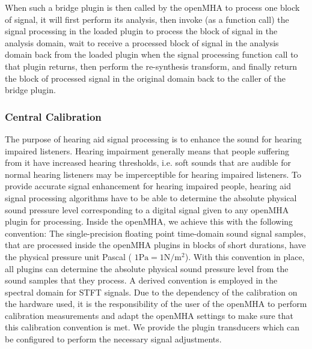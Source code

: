 When such a bridge plugin is then called by the openMHA to process one block of signal, it will first perform its analysis, then invoke (as a function call) the signal processing in the loaded plugin to process the block of signal in the analysis domain, wait to receive a processed block of signal in the analysis domain back from the loaded plugin when the signal processing function call to that plugin returns, then perform the re-\/synthesis transform, and finally return the block of processed signal in the original domain back to the caller of the bridge plugin.\subsubsection{Central Calibration}\label{index_clb}
The purpose of hearing aid signal processing is to enhance the sound for hearing impaired listeners. Hearing impairment generally means that people suffering from it have increased hearing thresholds, i.e. soft sounds that are audible for normal hearing listeners may be imperceptible for hearing impaired listeners. To provide accurate signal enhancement for hearing impaired people, hearing aid signal processing algorithms have to be able to determine the absolute physical sound pressure level corresponding to a digital signal given to any openMHA plugin for processing. Inside the openMHA, we achieve this with the following convention: The single-\/precision floating point time-\/domain sound signal samples, that are processed inside the openMHA plugins in blocks of short durations, have the physical pressure unit Pascal ( $1 \mathrm{Pa} = 1 \mathrm{N} / \mathrm{m}^2$). With this convention in place, all plugins can determine the absolute physical sound pressure level from the sound samples that they process. A derived convention is employed in the spectral domain for STFT signals. Due to the dependency of the calibration on the hardware used, it is the responsibility of the user of the openMHA to perform calibration measurements and adapt the openMHA settings to make sure that this calibration convention is met. We provide the plugin {\ttfamily transducers} which can be configured to perform the necessary signal adjustments. 

